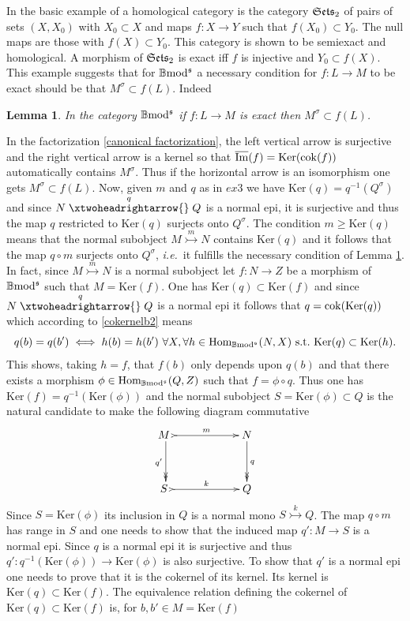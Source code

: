 \documentclass[12pt]{article}
\newtheorem{lem}[thm]{Lemma}
\def\Hom{{\rm Hom}}
\def\Ker{{\rm Ker}}
\def\scoker{{\rm cok}}
\def\B{{\mathbb B}}
\def\imm{\overline{\rm Im}}
\newcommand{\ie}{{\it i.e.\/}\ }
\def\ker{{\mbox{Ker}}}
\def\Hom {{\mbox{Hom}}}
\def\b2{{\rm \B mod^{\mathfrak s}}}
\def\Se{\frak{ Sets}}
\begin{document}
  In \cite{gra1} the basic example of a homological category is the category $\Se_2$ of pairs of sets $(X,X_0)$ with $X_0\subset X$ and maps $f:X\to Y$ such that $f(X_0)\subset Y_0$. The  null maps are those with $f(X)\subset Y_0$. This category is shown to be semiexact and homological. A morphism of $\Se_2$ is exact iff $f$ is injective and $Y_0\subset f(X)$. This example suggests that for $\b2$ a necessary condition for $f:L\to M$ to be exact should be that $M^\sigma\subset f(L)$. Indeed
  \begin{lem}\label{exactneccond} In the category $\b2$ if $f:L\to M$ is exact then  $M^\sigma\subset f(L)$.
  \end{lem}
\proof In the factorization \eqref{canonical factorization}, the left vertical arrow is surjective and the right vertical arrow is a kernel so that $\imm(f)=\ker(\scoker(f))$ automatically contains $M^\sigma$. Thus if the horizontal arrow is an isomorphism one gets $M^\sigma\subset f(L)$.\endproof
Now, given $m$ and $q$ as in $ex3$ we have  $\ker(q)=q^{-1}(Q^\sigma)$ and since  $N\stackrel{q}{\xtwoheadrightarrow{}} Q$ is a normal epi, it is surjective and thus the map $q$ restricted to $\ker(q)$ surjects onto $Q^\sigma$. The condition $m\geq \ker(q)$ means that the normal subobject $M\stackrel{m}{\rightarrowtail} N$ contains $\ker(q)$ and it follows that the map $q\circ m$  surjects onto $Q^\sigma$, \ie it fulfills the necessary condition of  Lemma \ref{exactneccond}. In fact, since $M\stackrel{m}{\rightarrowtail} N$ is a normal subobject let $f:N\to Z$ be a morphism of $\b2$ such that $M=\ker(f)$. One has $\ker(q)\subset \ker(f)$ and since  $N\stackrel{q}{\xtwoheadrightarrow{}} Q$ is a normal epi it follows that $q=\scoker(\ker(q))$ which according to \eqref{cokernelb2} means  $$
 q(b)= q(b')\iff h(b)=h(b')\ \forall X, \forall h\in \Hom_\b2(N,X)~{\rm s.t.}~ \ker(q)\subset \Ker(h).$$
 This shows, taking $h=f$, that $f(b)$ only depends upon $q(b)$ and that there exists a morphism $\phi\in \Hom_\b2(Q,Z)$ such that $f=\phi\circ q$. Thus one has $\ker(f)=q^{-1}(\ker(\phi))$ and the normal subobject $S=\ker(\phi)\subset Q$ is the natural candidate to make the following diagram commutative
  \begin{equation}\label{guess for S}
\xymatrix@C=25pt@R=35pt{
 M \ \ar@{->>}[d]_{q'}\ar@{>->}[rr]^{m} && N \ar@{->>}[d]^{q}
\\
S \ \ar@{>->}[rr]^{k}&& Q}
\end{equation}
Since $S=\ker(\phi)$ its inclusion in $Q$ is a normal mono $S\stackrel{k}{\rightarrowtail} Q$. The map $q\circ m$ has range in $S$ and one needs to show that the induced map $q':M\to S$ is a normal epi. Since $q$ is a normal epi it is surjective and thus $q':q^{-1}(\ker(\phi))\to \ker(\phi)$ is also surjective. To show that $q'$ is a normal epi one needs to prove that it is the cokernel of its kernel. Its kernel is $\ker(q)\subset \ker(f)$. The equivalence relation defining the cokernel of $\ker(q)\subset \ker(f)$ is, for $b,b'\in M =\ker(f)$
\end{document}
